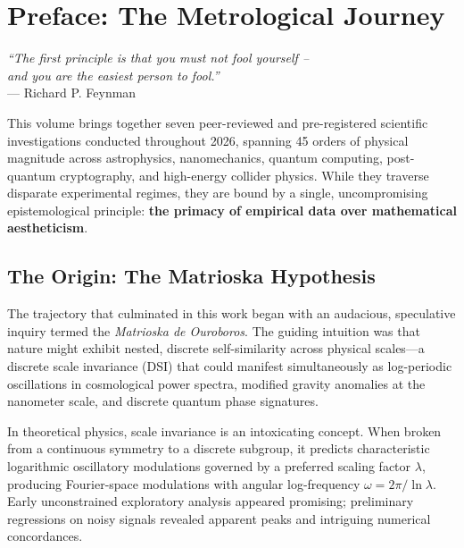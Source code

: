 \chapter*{Preface: The Metrological Journey}

\begin{flushright}
\textit{``The first principle is that you must not fool yourself --\\
and you are the easiest person to fool.''}\\
--- Richard P. Feynman
\end{flushright}

\vspace{1cm}

\noindent This volume brings together seven peer-reviewed and pre-registered scientific investigations conducted throughout 2026, spanning 45 orders of physical magnitude across astrophysics, nanomechanics, quantum computing, post-quantum cryptography, and high-energy collider physics. While they traverse disparate experimental regimes, they are bound by a single, uncompromising epistemological principle: \textbf{the primacy of empirical data over mathematical aestheticism}.

\section*{The Origin: The Matrioska Hypothesis}
The trajectory that culminated in this work began with an audacious, speculative inquiry termed the \textit{Matrioska de Ouroboros}. The guiding intuition was that nature might exhibit nested, discrete self-similarity across physical scales---a discrete scale invariance (DSI) that could manifest simultaneously as log-periodic oscillations in cosmological power spectra, modified gravity anomalies at the nanometer scale, and discrete quantum phase signatures.

In theoretical physics, scale invariance is an intoxicating concept. When broken from a continuous symmetry to a discrete subgroup, it predicts characteristic logarithmic oscillatory modulations governed by a preferred scaling factor $\lambda$, producing Fourier-space modulations with angular log-frequency $\omega = 2\pi / \ln\lambda$. Early unconstrained exploratory analysis appeared promising; preliminary regressions on noisy signals revealed apparent peaks and intriguing numerical concordances.

